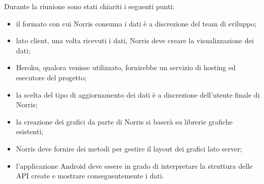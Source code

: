 Durante la riunione sono stati chiariti i seguenti punti:
\begin{itemize}
\item il formato con cui Norris consuma i dati è a discrezione del team di sviluppo;
\item lato client, una volta ricevuti i dati, Norris deve creare la visualizzazione dei dati;
\item Heroku, qualora venisse utilizzato, fornirebbe un servizio di hosting ed esecutore del progetto;
\item la scelta del tipo di aggiornamento dei dati è a discrezione dell'utente finale di Norris;
\item la creazione dei grafici da parte di Norris si baserà su librerie grafiche esistenti;
\item Norris deve fornire dei metodi per gestire il layout dei grafici lato server;
\item l'applicazione Android deve essere in grado di interpretare la struttura delle API create e mostrare conseguentemente i dati.
\end{itemize}
